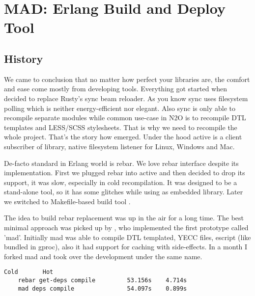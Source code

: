 \section{MAD: Erlang Build and Deploy Tool}

\subsection{History}

We came to conclusion that no matter how perfect your libraries are,
the comfort and ease come mostly from developing tools.
Everything got started when  decided to
replace Rusty's sync beam reloader. As you know sync uses
filesystem polling which is neither energy-efficient nor elegant. Also
sync is only able to recompile separate modules while
common use-case in N2O is to recompile DTL templates
and LESS/SCSS stylesheets. That is why we need to recompile
the whole project. That's the story how  emerged.
Under the hood active is a client subscriber
of  library, native filesystem listener for Linux, Windows and Mac.

De-facto standard in Erlang world is rebar.
We love rebar interface despite its implementation.
First we plugged rebar into active and then decided to drop its support,
it was slow, especially in cold recompilation.
It was designed to be a stand-alone tool, so it has some
glitches while using as embedded library.
Later we switched to Makefile-based build tool .

The idea to build rebar replacement was up in the air for a long time.
The best minimal approach was picked up by ,
who implemented the first prototype called 'mad'. Initially mad
was able to compile DTL templated, YECC files, escript (like
bundled in gproc), also it had support for caching with side-effects.
In a month I forked mad and took over the development under the same name.

\vspace{1\baselineskip}
\begin{lstlisting}[caption=Example of building N2O sample]
                                   Cold       Hot
    rebar get-deps compile         53.156s    4.714s
    mad deps compile               54.097s    0.899s
\end{lstlisting}
\vspace{1\baselineskip}

